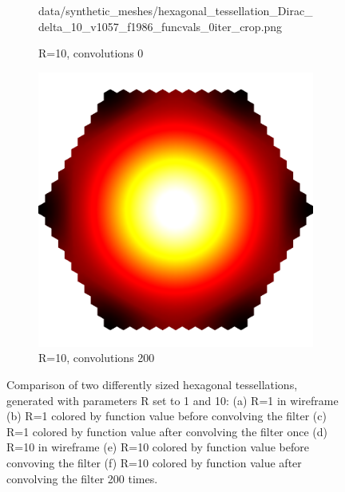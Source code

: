 \begin{figure}[ht]
\begin{subfigure}[b]{0.32\linewidth}
		{data/synthetic_meshes/hexagonal_tessellation_Dirac_delta_10_v1057_f1986_funcvals_0iter_crop.png}
		\caption{R=10, convolutions 0}\label{fig:hex.e}
	\end{subfigure}
	\begin{subfigure}[b]{0.32\linewidth}
		\includegraphics[width=\linewidth]{data/synthetic_meshes/hexagonal_tessellation_Dirac_delta_10_v1057_f1986_funcvals_200iter_crop.png}
		\caption{R=10, convolutions 200}\label{fig:hex.f}
	\end{subfigure}
	\caption[Six views, comparing two differently sized of hexagonal tessellations]{Comparison of two differently sized hexagonal tessellations, generated with parameters R set to 1 and 10: (a) R=1 in wireframe (b) R=1 colored by function value before convolving the filter (c) R=1 colored by function value after convolving the filter once (d) R=10 in wireframe (e) R=10 colored by function value before convoving the filter (f) R=10 colored by function value after convolving the filter 200 times.}
	\label{fig:hex}
\end{figure}
\todoCitation{}
